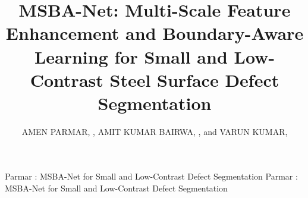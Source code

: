\documentclass{ieeeaccess}
\begin{document}

\title{MSBA-Net: Multi-Scale Feature Enhancement and Boundary-Aware Learning for Small and Low-Contrast Steel Surface Defect Segmentation}

\author{\uppercase{Amen Parmar}, ,
\uppercase{Amit Kumar Bairwa}, ,
and \uppercase{Varun Kumar}, }

\address[1]{Department of Computer Science and Engineering, Manipal University Jaipur, Jaipur, Rajasthan 303007, India}

\markboth
{Parmar \headeretal: MSBA-Net for Small and Low-Contrast Defect Segmentation}
{Parmar \headeretal: MSBA-Net for Small and Low-Contrast Defect Segmentation}

\end{document}
